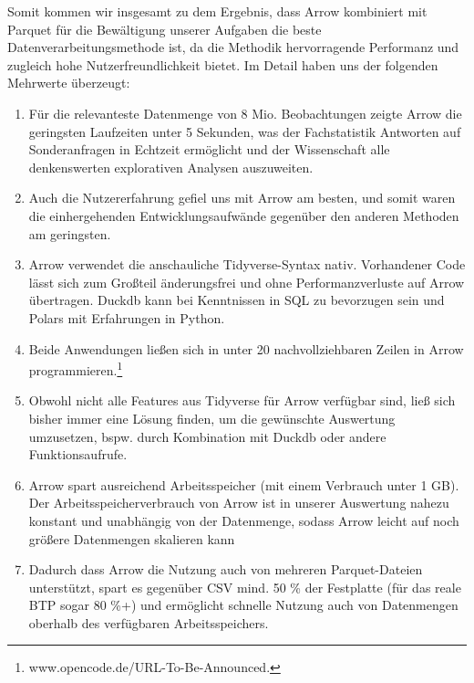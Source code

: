 \documentclass[
  german,
  10pt,
  twoside]{article}
\providecommand{\tightlist}{%
  \setlength{\itemsep}{0pt}\setlength{\parskip}{0pt}}
\begin{document}
Somit kommen wir insgesamt zu dem Ergebnis, dass Arrow kombiniert mit
Parquet für die Bewältigung unserer Aufgaben die beste
Datenverarbeitungsmethode ist, da die Methodik hervorragende Performanz
und zugleich hohe Nutzerfreundlichkeit bietet. Im Detail haben uns der
folgenden Mehrwerte überzeugt:

\begin{enumerate}
\def\labelenumi{\arabic{enumi}.}
\tightlist
\item
  Für die relevanteste Datenmenge von 8 Mio. Beobachtungen zeigte Arrow
  die geringsten Laufzeiten unter 5 Sekunden, was der Fachstatistik
  Antworten auf Sonderanfragen in Echtzeit ermöglicht und der
  Wissenschaft alle denkenswerten explorativen Analysen auszuweiten.
\item
  Auch die Nutzererfahrung gefiel uns mit Arrow am besten, und somit
  waren die einhergehenden Entwicklungsaufwände gegenüber den anderen
  Methoden am geringsten.
\item
  Arrow verwendet die anschauliche Tidyverse-Syntax nativ. Vorhandener
  Code lässt sich zum Großteil änderungsfrei und ohne Performanzverluste
  auf Arrow übertragen. Duckdb kann bei Kenntnissen in SQL zu bevorzugen
  sein und Polars mit Erfahrungen in Python.
\item
  Beide Anwendungen ließen sich in unter 20 nachvollziehbaren Zeilen in
  Arrow programmieren.\footnote{www.opencode.de/URL-To-Be-Announced.}
\item
  Obwohl nicht alle Features aus Tidyverse für Arrow verfügbar sind,
  ließ sich bisher immer eine Lösung finden, um die gewünschte
  Auswertung umzusetzen, bspw. durch Kombination mit Duckdb oder andere
  Funktionsaufrufe.
\item
  Arrow spart ausreichend Arbeitsspeicher (mit einem Verbrauch unter 1
  GB). Der Arbeitsspeicherverbrauch von Arrow ist in unserer Auswertung
  nahezu konstant und unabhängig von der Datenmenge, sodass Arrow leicht
  auf noch größere Datenmengen skalieren kann
\item
  Dadurch dass Arrow die Nutzung auch von mehreren Parquet-Dateien
  unterstützt, spart es gegenüber CSV mind. 50 \% der Festplatte (für
  das reale BTP sogar 80 \%+) und ermöglicht schnelle Nutzung auch von
  Datenmengen oberhalb des verfügbaren Arbeitsspeichers.
\end{enumerate}
\end{document}
